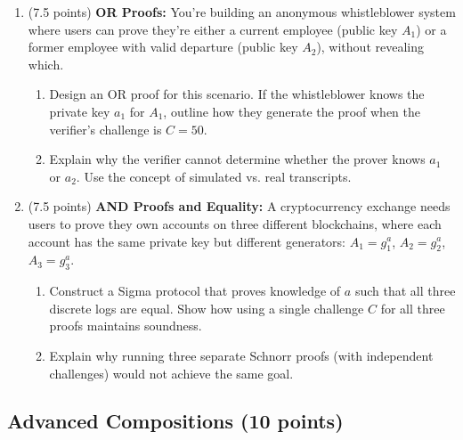 \documentclass[10pt,a4paper,american]{article}
\begin{document}
\begin{enumerate}
	\item (7.5 points) \textbf{OR Proofs:}
	      You're building an anonymous whistleblower system where users can prove they're either a current employee (public key $A_1$) or a former employee with valid departure (public key $A_2$), without revealing which.
	      \begin{enumerate}
		      \item Design an OR proof for this scenario. If the whistleblower knows the private key $a_1$ for $A_1$, outline how they generate the proof when the verifier's challenge is $C = 50$.
		      \item Explain why the verifier cannot determine whether the prover knows $a_1$ or $a_2$. Use the concept of simulated vs. real transcripts.
	      \end{enumerate}
	\item (7.5 points) \textbf{AND Proofs and Equality:}
	      A cryptocurrency exchange needs users to prove they own accounts on three different blockchains, where each account has the same private key but different generators: $A_1 = g_1^a$, $A_2 = g_2^a$, $A_3 = g_3^a$.
	      \begin{enumerate}
		      \item Construct a Sigma protocol that proves knowledge of $a$ such that all three discrete logs are equal. Show how using a single challenge $C$ for all three proofs maintains soundness.
		      \item Explain why running three separate Schnorr proofs (with independent challenges) would not achieve the same goal.
	      \end{enumerate}
\end{enumerate}

\subsection{Advanced Compositions (10 points)}
\end{document}
